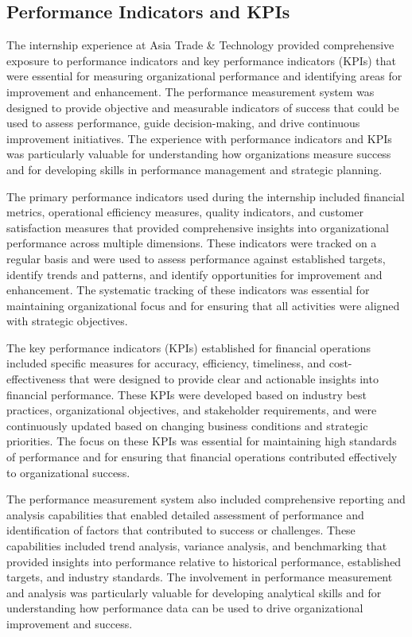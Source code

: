 \subsection{Performance Indicators and KPIs}
The internship experience at Asia Trade \& Technology provided comprehensive exposure to performance indicators and key performance indicators (KPIs) that were essential for measuring organizational performance and identifying areas for improvement and enhancement. The performance measurement system was designed to provide objective and measurable indicators of success that could be used to assess performance, guide decision-making, and drive continuous improvement initiatives. The experience with performance indicators and KPIs was particularly valuable for understanding how organizations measure success and for developing skills in performance management and strategic planning.

The primary performance indicators used during the internship included financial metrics, operational efficiency measures, quality indicators, and customer satisfaction measures that provided comprehensive insights into organizational performance across multiple dimensions. These indicators were tracked on a regular basis and were used to assess performance against established targets, identify trends and patterns, and identify opportunities for improvement and enhancement. The systematic tracking of these indicators was essential for maintaining organizational focus and for ensuring that all activities were aligned with strategic objectives.

The key performance indicators (KPIs) established for financial operations included specific measures for accuracy, efficiency, timeliness, and cost-effectiveness that were designed to provide clear and actionable insights into financial performance. These KPIs were developed based on industry best practices, organizational objectives, and stakeholder requirements, and were continuously updated based on changing business conditions and strategic priorities. The focus on these KPIs was essential for maintaining high standards of performance and for ensuring that financial operations contributed effectively to organizational success.

The performance measurement system also included comprehensive reporting and analysis capabilities that enabled detailed assessment of performance and identification of factors that contributed to success or challenges. These capabilities included trend analysis, variance analysis, and benchmarking that provided insights into performance relative to historical performance, established targets, and industry standards. The involvement in performance measurement and analysis was particularly valuable for developing analytical skills and for understanding how performance data can be used to drive organizational improvement and success.

